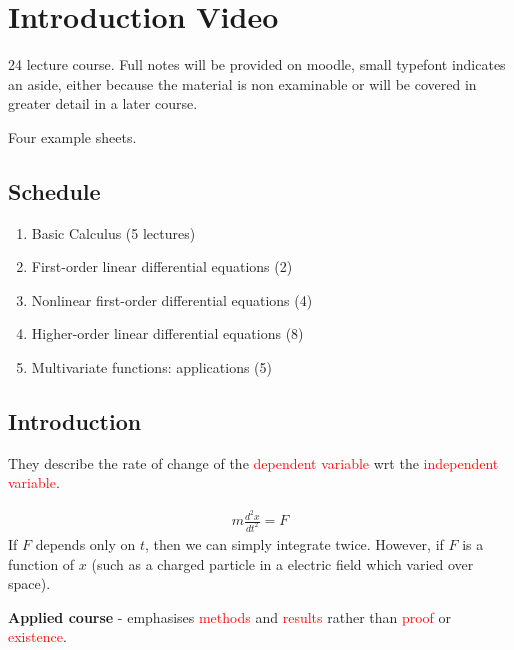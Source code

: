 \hypertarget{introduction-video}{%
\section*{Introduction Video}\label{introduction-video}}

24 lecture course. 
Full notes will be provided on moodle, small typefont indicates an aside, either because the material is non examinable or will be covered in greater detail in a later course.

Four example sheets.

\hypertarget{schedule}{%
\subsection{Schedule}\label{schedule}}

\begin{enumerate}
\def\labelenumi{\arabic{enumi}.}
\tightlist
\item
  Basic Calculus (5 lectures)
\item
  First-order linear differential equations (2)
\item
  Nonlinear first-order differential equations (4)
\item
  Higher-order linear differential equations (8)
\item
  Multivariate functions: applications (5)
\end{enumerate}

\hypertarget{introduction}{%
\subsection{Introduction}\label{introduction}}

They describe the rate of change of the \textcolor{red}{dependent variable} wrt the \textcolor{red}{independent variable}.

\begin{example}
\begin{align*}
  m \frac{d^2 x}{d t^2} = F
\end{align*}
If \(F\) depends only on \(t\), then we can simply integrate twice. However, if \(F\) is a function of \(x\) (such as a charged particle in a electric field which varied over space).
\end{example}

\textbf{Applied course} - emphasises \textcolor{red}{methods} and \textcolor{red}{results} rather than \textcolor{red}{proof} or \textcolor{red}{existence}.

